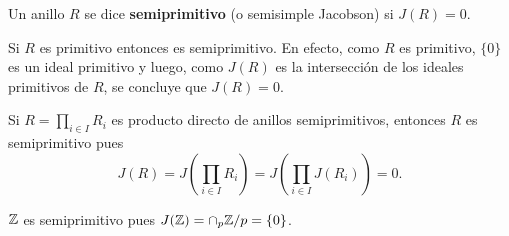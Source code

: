 




\begin{definition}
	Un anillo $R$ se dice \textbf{semiprimitivo} (o semisimple Jacobson) si
	$J(R)=0$.
\end{definition}

\begin{example}
	Si $R$ es primitivo entonces es semiprimitivo. En efecto, como $R$ es
	primitivo, $\{0\}$ es un ideal primitivo y luego, como $J(R)$ es la
	intersección de los ideales primitivos de $R$, se concluye que $J(R)=0$.
\end{example}

\begin{example}
	Si $R=\prod_{i\in I}R_i$ es producto directo de anillos semiprimitivos,
	entonces $R$ es semiprimitivo pues 
	\[
		J(R)=J\left(\prod_{i\in I}R_i\right)=J\left(\prod_{i\in I}J(R_i)\right)=0.
	\]
\end{example}

\begin{example}
	$\mathbb{Z}$ es semiprimitivo pues $J(\mathbb{Z})=\cap_{p}\mathbb{Z}/p=\{0\}$.
\end{example}

